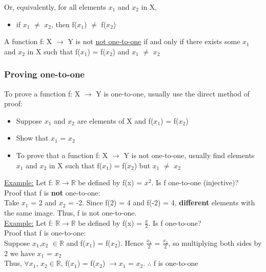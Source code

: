 \documentclass{article}
\begin{document}
Or, equivalently, for all elements $x_{1}$ and $x_{2}$ in X,
\begin{itemize}
\item if $x_{1}$ $\neq$ $x_{2}$, then f($x_{1}$) $\neq$ f($x_{2}$)
\end{itemize}

A function f: X $\longrightarrow$ Y is not \underline{not one-to-one} if and only if there exists some $x_{1}$ and $x_{2}$ in X such that  f($x_{1}$) = f($x_{2}$) and $x_{1}$ $\neq$ $x_{2}$

\subsubsection{Proving one-to-one}

To prove a function f: X $\longrightarrow$ Y is one-to-one, usually use the direct method of proof:
\begin{itemize}
\item Suppose $x_{1}$ and $x_{2}$ are elements of X and f($x_{1}$) = f($x_{2}$)
\item Show that $x_{1}$ = $x_{2}$
\item To prove that a function f: X $\longrightarrow$ Y is not one-to-one, usually find elements $x_{1}$ and $x_{2}$ in X such that f($x_{1}$) = f($x_{2}$) but $x_{1}$ $\neq$ $x_{2}$
\end{itemize}

\underline{Example:}
Let f: $\mathbb{R} \longrightarrow \mathbb{R}$ be defined by f(x) = $x^{2}$. Is f one-to-one (injective)? \\

Proof that f is \textbf{not} one-to-one: \\
Take $x_{1}$ = 2 and $x_{2}$ = -2. Since f(2) = 4 and f(-2) = 4, \textbf{different} elements with the same image. Thus, f is not one-to-one. \\

\underline{Example:}
Let f: $\mathbb{R} \longrightarrow \mathbb{R}$ be defined by f(x) = $\frac{x}{2}$. Is f one-to-one? \\

Proof that f is one-to-one: \\
Suppose $x_{1}$,$x_{2}$ $\in \mathbb{R}$ and f($x_{1}$) = f($x_{2}$). Hence $\frac{x_{1}}{2}$ = $\frac{x_{2}}{2}$, so multiplying both sides by 2 we have $x_{1}$ = $x_{2}$ \\

Thus, $\forall x_{1}$, $x_{2} \in \mathbb{R}$, f($x_{1}$) = f($x_{2}$) $\rightarrow x_{1}$ = $x_{2}$. $\therefore$ f is one-to-one
\end{document}
